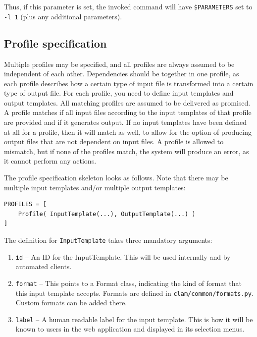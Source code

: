 \documentclass[a4paper,12pt,twoside,openright]{report}
\begin{document}
Thus, if this parameter is set, the invoked command will have \texttt{\$PARAMETERS} set to \texttt{-l 1} (plus any additional parameters).

\subsection{Profile specification}

Multiple profiles may be specified, and all profiles are always assumed to be
independent of each other. Dependencies should be together in one profile, as
each profile describes how a certain type of input file is transformed into a
certain type of output file. For each profile, you need to define input
templates and output templates. All matching profiles are assumed to be
delivered as promised. A profile matches if all input files according to the
input templates of that profile are provided and if it generates output. If no
input templates have been defined at all for a profile, then it will match as
well, to allow for the option of producing output files that are not dependent
on input files. A profile is allowed to mismatch, but if none of the profiles
match, the system will produce an error, as it cannot perform any actions. 

The profile specification skeleton looks as follows. Note that there may be
multiple input templates and/or multiple output templates:

{\small
\begin{verbatim}
PROFILES = [ 
    Profile( InputTemplate(...), OutputTemplate(...) ) 
]
\end{verbatim}
}


The definition for \texttt{InputTemplate} takes three mandatory arguments:

\begin{enumerate}[leftmargin=5mm]
\item \texttt{id} -- An ID for the InputTemplate. This will be used internally and by automated clients.
\item \texttt{format} -- This points to a Format class, indicating the kind of format that this input template accepts. Formats are defined in \texttt{clam/common/formats.py}. Custom formats can be added there.
\item \texttt{label} -- A human readable label for the input template. This is how it will be known to users in the web application and displayed in its selection menus.
\end{enumerate}
\end{document}
